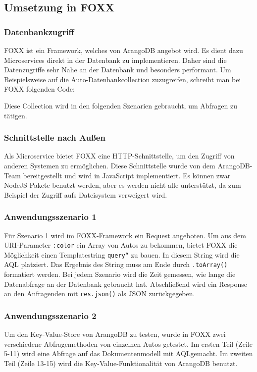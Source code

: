\subsection{Umsetzung in FOXX}
\subsubsection{Datenbankzugriff}
FOXX ist ein Framework, welches von ArangoDB angebot wird. Es dient dazu Microservices direkt in der Datenbank zu implementieren. Daher sind die Datenzugriffe sehr Nahe an der Datenbank und besonders performant. Um Beispielsweise auf die Auto-Datenbankcollection zuzugreifen, schreibt man bei FOXX folgenden Code:

Diese Collection wird in den folgenden Szenarien gebraucht, um Abfragen zu tätigen.
\subsubsection{Schnittstelle nach Außen}
Als Microservice bietet FOXX eine HTTP-Schnittstelle, um den Zugriff von anderen Systemen zu ermöglichen. Diese Schnittstelle wurde von dem ArangoDB-Team bereitgestellt und wird in JavaScript implementiert. Es können zwar NodeJS Pakete benutzt werden, aber es werden nicht alle unterstützt, da zum Beispiel der Zugriff aufs Dateisystem verweigert wird.
\subsubsection{Anwendungsszenario 1}
Für Szenario 1 wird im FOXX-Framework ein Request angeboten. Um aus dem URI-Parameter \texttt{:color} ein Array von Autos zu bekommen, bietet FOXX die Möglichkeit einen Templatestring \texttt{query``} zu bauen. In diesem String wird die \ac{AQL} platziert. Das Ergebnis des String muss am Ende durch \texttt{.toArray()} formatiert werden. Bei jedem Szenario wird die Zeit gemessen, wie lange die Datenabfrage an der Datenbank gebraucht hat. Abschließend wird ein Response an den Anfragenden mit \texttt{res.json()} als \ac{JSON} zurückgegeben.

\subsubsection{Anwendungsszenario 2}
Um den Key-Value-Store von ArangoDB zu testen, wurde in FOXX zwei verschiedene Abfragemethoden von einzelnen Autos getestet. Im ersten Teil (Zeile 5-11) wird eine Abfrage auf das Dokumentenmodell mit \ac{AQL}gemacht. Im zweiten Teil (Zeile 13-15) wird die Key-Value-Funktionalität von ArangoDB benutzt.

